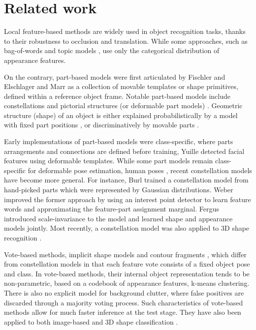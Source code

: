 \section{Related work}
\label{sec/reg/relatedwork}

Local feature-based methods are widely used in object recognition tasks, thanks to their robustness to occlusion and translation. While some approaches, such as bag-of-words \cite{Sivic2005, Fei-Fei2005} and topic models \cite{Fergus2005}, use only the categorical distribution of appearance features. 

On the contrary, part-based models were first articulated by Fischler and Elschlager \cite{Fischler1973} and Marr \cite{Marr1982} as a collection of movable templates or shape primitives, defined within a reference object frame. Notable part-based models include constellations \cite{Weber2000, Fergus2007} and pictorial structures (or deformable part models) \cite{Felzenszwalb2005}. Geometric structure (shape) of an object is either explained probabilistically by a model with fixed part positions \cite{Fergus2007}, or discriminatively by movable parts \cite{Yuille1989, Felzenszwalb2005}.

Early implementations of part-based models were class-specific, where parts arrangements and connections are defined before training, \eg Yuille \etal \cite{Yuille1989} detected facial features using deformable templates. While some part models remain class-specific for deformable pose estimation, \eg human poses \cite{Yang2011, Eichner2012}, recent constellation models have become more general. For instance, Burl \etal \cite{Burl1998} trained a constellation model from hand-picked parts which were represented by Gaussian distributions. Weber \etal \cite{Weber2000} improved the former approach by using an interest point detector \cite{Kadir2001} to learn feature words and approximating the feature-part assignment marginal. Fergus \etal \cite{Fergus2007} introduced scale-invariance to the model and learned shape and appearance models jointly. Most recently, a constellation model was also applied to 3D shape recognition \cite{MuktaPrasad2011}.

Vote-based methods, \eg implicit shape models \cite{Leibe2008} and contour fragments \cite{Shotton2008a}, which differ from constellation models in that each feature vote consists of a fixed object pose and class. In vote-based methods, their internal object representation tends to be non-parametric, based on a codebook of appearance features, \eg k-means clustering. There is also no explicit model for background clutter, where false positives are discarded through a majority voting process. Such characteristics of vote-based methods allow for much faster inference at the test stage. They have also been applied to both image-based \cite{Leibe2008, Shotton2008} and 3D shape classification \cite{Flitton2010,  Knopp2010, Pham2011, Barinova2010}.

